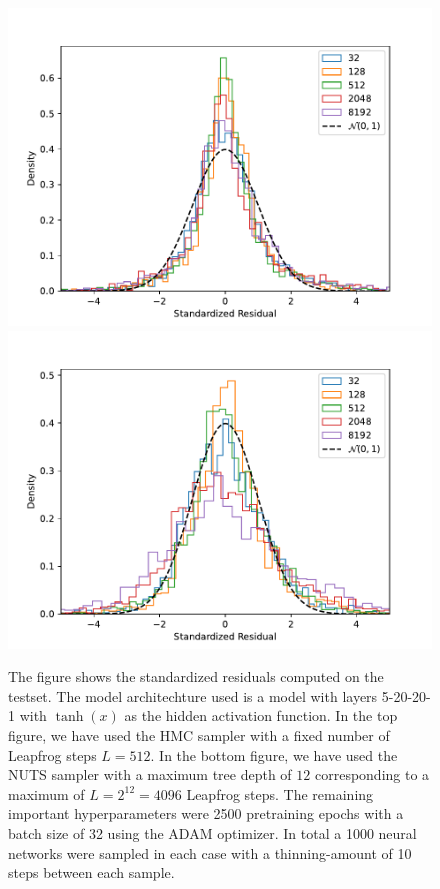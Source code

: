 \begin{figure}
    \centering
    \includegraphics[scale=0.7]{figures/standardized_residuals/effect_of_burnin/standardized_residuals_hmc_vs_burn_in_steps.pdf}
    \includegraphics[scale=0.7]{figures/standardized_residuals/effect_of_burnin/standardized_residuals_nuts_vs_burn_in_steps.pdf}
    \caption{The figure shows the standardized residuals computed on the testset. The model architechture used is a model with layers 5-20-20-1 with $\tanh(x)$ as the hidden activation function. In the top figure, we have used the HMC sampler with a fixed number of Leapfrog steps $L = 512$. In the bottom figure, we have used the NUTS sampler with a maximum tree depth of $12$ corresponding to a maximum of $L = 2^{12} = 4096$ Leapfrog steps. The remaining important hyperparameters were 2500 pretraining epochs with a batch size of 32 using the ADAM optimizer. In total a 1000 neural networks were sampled in each case with a thinning-amount of 10 steps between each sample.
    }
    \label{fig:standardized_residuals_vs_burn_in_steps}
\end{figure}


